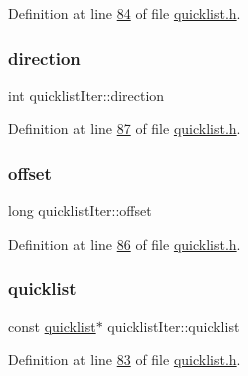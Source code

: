 Definition at line \hyperlink{quicklist_8h_source_l00084}{84} of file \hyperlink{quicklist_8h_source}{quicklist.\+h}.

\mbox{\label{structquicklistIter_ab4f85637054a1824e3bcff6ea7165c61}} 
\subsubsection{\texorpdfstring{direction}{direction}}
{\footnotesize\ttfamily int quicklist\+Iter\+::direction}



Definition at line \hyperlink{quicklist_8h_source_l00087}{87} of file \hyperlink{quicklist_8h_source}{quicklist.\+h}.

\mbox{\label{structquicklistIter_ac9cddc582b7ef36c9a6973af2613346a}} 
\subsubsection{\texorpdfstring{offset}{offset}}
{\footnotesize\ttfamily long quicklist\+Iter\+::offset}



Definition at line \hyperlink{quicklist_8h_source_l00086}{86} of file \hyperlink{quicklist_8h_source}{quicklist.\+h}.

\mbox{\label{structquicklistIter_a96f3cb9620d02fd35ce23c3e1dc78fe6}} 
\subsubsection{\texorpdfstring{quicklist}{quicklist}}
{\footnotesize\ttfamily const \hyperlink{structquicklist}{quicklist}$\ast$ quicklist\+Iter\+::quicklist}



Definition at line \hyperlink{quicklist_8h_source_l00083}{83} of file \hyperlink{quicklist_8h_source}{quicklist.\+h}.

\mbox{\label{structquicklistIter_a39666e7cf1a235782c450a312f24fa53}} 
